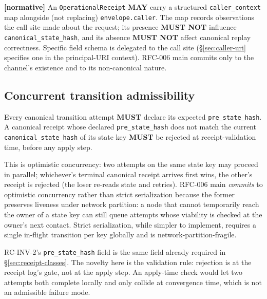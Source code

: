 \documentclass[11pt,a4paper]{article}
\newcommand{\normsv}{\textcolor{normativecolor}{\textbf{[normative]}}\xspace}
\theoremstyle{definition}
\begin{document}
\normsv{}
An \texttt{OperationalReceipt} \textbf{MAY} carry a structured
\texttt{caller\_context} map alongside (not replacing)
\texttt{envelope.caller}. The map records observations the call
site made about the request; its presence \textbf{MUST NOT}
influence \texttt{canonical\_state\_hash}, and its absence
\textbf{MUST NOT} affect canonical replay correctness. Specific
field schema is delegated to the call site (\S\ref{sec:caller-uri}
specifies one in the principal-URI context). RFC-006 main commits
only to the channel's existence and to its non-canonical nature.

\subsection{Concurrent transition admissibility}
\label{sec:concurrency}

\begin{invariant}[RC-INV-2]
Every canonical transition attempt \textbf{MUST} declare its
expected \texttt{pre\_state\_hash}. A canonical receipt whose
declared \texttt{pre\_state\_hash} does not match the current
\texttt{canonical\_state\_hash} of its state key \textbf{MUST}
be rejected at receipt-validation time, before any apply step.
\end{invariant}

This is optimistic concurrency: two attempts on the same state key
may proceed in parallel; whichever's terminal canonical receipt
arrives first wins, the other's receipt is rejected (the loser
re-reads state and retries). RFC-006 main \emph{commits} to
optimistic concurrency rather than strict serialization because the
former preserves liveness under network partition: a node that
cannot temporarily reach the owner of a state key can still queue
attempts whose viability is checked at the owner's next contact.
Strict serialization, while simpler to implement, requires a
single in-flight transition per key globally and is
network-partition-fragile.

\begin{notebox}
RC-INV-2's \texttt{pre\_state\_hash} field is the same field
already required in \S\ref{sec:receipt-classes}. The novelty here
is the validation rule: rejection is at the receipt log's gate,
not at the apply step. An apply-time check would let two attempts
both complete locally and only collide at convergence time, which
is not an admissible failure mode.
\end{notebox}

\end{document}
